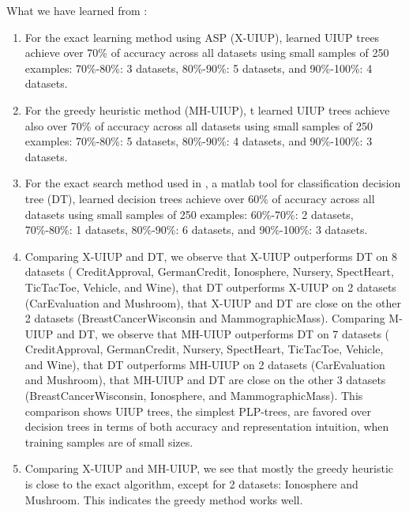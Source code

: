 What we have learned from :
\begin{enumerate}
	\item For the exact learning method using ASP (X-UIUP),
				learned UIUP trees achieve over 70\% of accuracy across all datasets using small 
				samples of 250 examples:
				70\%-80\%: 3 datasets, 80\%-90\%: 5 datasets, and 90\%-100\%: 4 datasets.
	\item For the greedy heuristic method (MH-UIUP),
				t learned UIUP trees achieve also over 70\% of accuracy across all datasets using small
				samples of 250 examples:
				70\%-80\%: 5 datasets, 80\%-90\%: 4 datasets, and 90\%-100\%: 3 datasets.
	\item For the exact search method used in , a matlab tool for classification decision tree (DT),
				learned decision trees achieve over 60\% of accuracy across all datasets using small 
				samples of 250 examples: 60\%-70\%:  2 datasets,
				70\%-80\%: 1 datasets, 80\%-90\%: 6 datasets, and 90\%-100\%: 3 datasets.
	\item Comparing X-UIUP and DT, we observe that X-UIUP outperforms DT on 8 datasets (
				CreditApproval, GermanCredit, Ionosphere, Nursery, SpectHeart, TicTacToe, Vehicle,
				and Wine), that DT outperforms X-UIUP on 2 datasets (CarEvaluation and Mushroom),
				that X-UIUP and DT are close on the other 2 datasets (BreastCancerWisconsin and
				MammographicMass). 
				Comparing M-UIUP and DT, we observe that MH-UIUP outperforms DT on 7 datasets (
				CreditApproval, GermanCredit, Nursery, SpectHeart, TicTacToe, Vehicle,
				and Wine), that DT outperforms MH-UIUP on 2 datasets (CarEvaluation and Mushroom),
				that MH-UIUP and DT are close on the other 3 datasets (BreastCancerWisconsin, Ionosphere, and
				MammographicMass).
				This comparison shows UIUP trees, the simplest PLP-trees, are favored over decision trees
				in terms of both accuracy and representation intuition, when training samples are of
				small sizes.
	\item Comparing X-UIUP and MH-UIUP, we see that mostly the greedy heuristic is close to
				the exact algorithm, except for 2 datasets: Ionosphere and Mushroom.
				This indicates the greedy method works well.
\end{enumerate}



